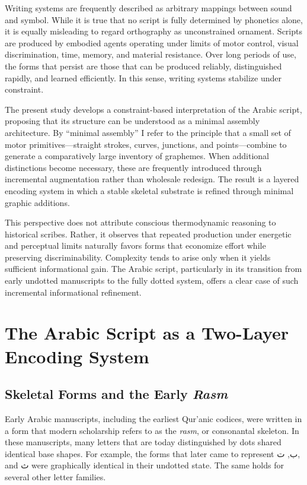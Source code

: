 \documentclass[11pt]{article}
\begin{document}
Writing systems are frequently described as arbitrary mappings between sound and symbol. While it is true that no script is fully determined by phonetics alone, it is equally misleading to regard orthography as unconstrained ornament. Scripts are produced by embodied agents operating under limits of motor control, visual discrimination, time, memory, and material resistance. Over long periods of use, the forms that persist are those that can be produced reliably, distinguished rapidly, and learned efficiently. In this sense, writing systems stabilize under constraint.

The present study develops a constraint-based interpretation of the Arabic script, proposing that its structure can be understood as a minimal assembly architecture. By ``minimal assembly'' I refer to the principle that a small set of motor primitives—straight strokes, curves, junctions, and points—combine to generate a comparatively large inventory of graphemes. When additional distinctions become necessary, these are frequently introduced through incremental augmentation rather than wholesale redesign. The result is a layered encoding system in which a stable skeletal substrate is refined through minimal graphic additions.

This perspective does not attribute conscious thermodynamic reasoning to historical scribes. Rather, it observes that repeated production under energetic and perceptual limits naturally favors forms that economize effort while preserving discriminability. Complexity tends to arise only when it yields sufficient informational gain. The Arabic script, particularly in its transition from early undotted manuscripts to the fully dotted system, offers a clear case of such incremental informational refinement.

\section{The Arabic Script as a Two-Layer Encoding System}

\subsection{Skeletal Forms and the Early \textit{Rasm}}

Early Arabic manuscripts, including the earliest Qur'anic codices, were written in a form that modern scholarship refers to as the \textit{rasm}, or consonantal skeleton. In these manuscripts, many letters that are today distinguished by dots shared identical base shapes. For example, the forms that later came to represent \textarabic{ب}, \textarabic{ت}, and \textarabic{ث} were graphically identical in their undotted state. The same holds for several other letter families.
\end{document}
